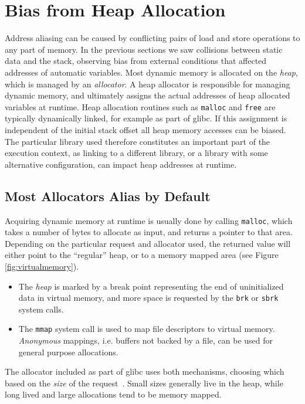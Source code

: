 \documentclass[prodmode,acmtaco]{acmsmall}
\begin{document}
\section{Bias from Heap Allocation}
\label{sec:heap}
Address aliasing can be caused by conflicting pairs of load and store operations to any part of memory.
In the previous sections we saw collisions between static data and the stack, observing bias from external conditions that affected addresses of automatic variables.
Most dynamic memory is allocated on the \emph{heap}, which is managed by an \emph{allocator}.
A heap allocator is responsible for managing dynamic memory, and ultimately assigns the actual addresses of heap allocated variables at runtime.
Heap allocation routines such as \texttt{malloc} and \texttt{free} are typically dynamically linked, for example as part of glibc.
If this assignment is independent of the initial stack offset all heap memory accesses can be biased.
The particular library used therefore constitutes an important part of the execution context, as linking to a different library, or a library with some alternative configuration, can impact heap addresses at runtime.

\subsection{Most Allocators Alias by Default}
Acquiring dynamic memory at runtime is usually done by calling \texttt{malloc}, which takes a number of bytes to allocate as input, and returns a pointer to that area.
Depending on the particular request and allocator used, the returned value will either point to the ``regular'' heap, or to a memory mapped area (see Figure \ref{fig:virtualmemory}).
\begin{itemize}
  \item The \emph{heap} is marked by a break point representing the end of uninitialized data in virtual memory, and more space is requested by the \texttt{brk} or \texttt{sbrk} system calls.
  \item The \texttt{mmap} system call is used to map file descriptors to virtual memory. \emph{Anonymous} mappings, i.e. buffers not backed by a file, can be used for general purpose allocations.
\end{itemize}
The allocator included as part of glibc uses both mechanisms, choosing which based on the \emph{size} of the request~\cite{GlibcManual}.
Small sizes generally live in the heap, while long lived and large allocations tend to be memory mapped.
\end{document}
